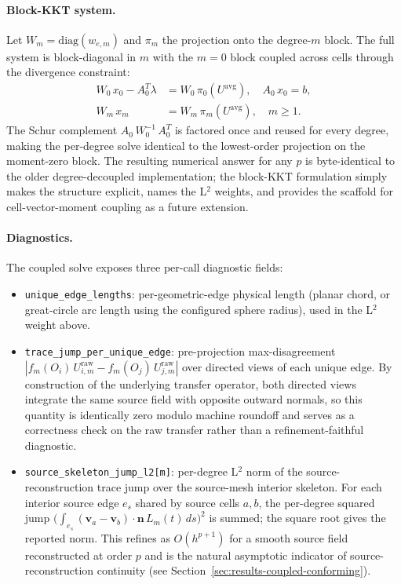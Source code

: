 \documentclass[11pt]{article}
\begin{document}
\paragraph{Block-KKT system.}
Let \(W_m=\mathrm{diag}(w_{e,m})\) and \(\pi_m\) the projection onto the
degree-\(m\) block.  The full system is block-diagonal in \(m\) with the
\(m=0\) block coupled across cells through the divergence constraint:
\begin{equation}
  \begin{aligned}
    W_0\,x_0 - A_0^T \lambda &= W_0\,\pi_0(U^{\mathrm{avg}}),
    \quad
    A_0\,x_0 = b,
    \\
    W_m\,x_m &= W_m\,\pi_m(U^{\mathrm{avg}}),
    \quad m\ge1.
  \end{aligned}
  \label{eq:coupled-conforming-block-kkt}
\end{equation}
The Schur complement \(A_0\,W_0^{-1}\,A_0^T\) is factored once and reused for
every degree, making the per-degree solve identical to the lowest-order
projection on the moment-zero block.  The resulting numerical answer for any
\(p\) is byte-identical to the older degree-decoupled implementation; the
block-KKT formulation simply makes the structure explicit, names the L\(^2\)
weights, and provides the scaffold for cell-vector-moment coupling as a
future extension.

\paragraph{Diagnostics.}
The coupled solve exposes three per-call diagnostic fields:
\begin{itemize}
  \item \texttt{unique\_edge\_lengths}: per-geometric-edge physical length
        (planar chord, or great-circle arc length using the configured sphere
        radius), used in the L\(^2\) weight above.
  \item \texttt{trace\_jump\_per\_unique\_edge}: pre-projection
        max-disagreement \(|f_m(O_i)\,U^{\mathrm{raw}}_{i,m}
        - f_m(O_j)\,U^{\mathrm{raw}}_{j,m}|\) over directed views of each
        unique edge.  By construction of the underlying transfer operator,
        both directed views integrate the same source field with opposite
        outward normals, so this quantity is identically zero modulo machine
        roundoff and serves as a correctness check on the raw transfer rather
        than a refinement-faithful diagnostic.
  \item \texttt{source\_skeleton\_jump\_l2[m]}: per-degree L\(^2\) norm of the
        source-reconstruction trace jump over the source-mesh interior
        skeleton.  For each interior source edge \(e_s\) shared by source
        cells \(a, b\), the per-degree squared jump
        \(\bigl(\int_{e_s}(\mathbf{v}_a - \mathbf{v}_b)\cdot\mathbf{n}\,
        L_m(t)\,ds\bigr)^2\) is summed; the square root gives the reported
        norm.  This refines as \(O(h^{p+1})\) for a smooth source field
        reconstructed at order \(p\) and is the natural asymptotic
        indicator of source-reconstruction continuity (see
        Section~\ref{sec:results-coupled-conforming}).
\end{itemize}
\end{document}

